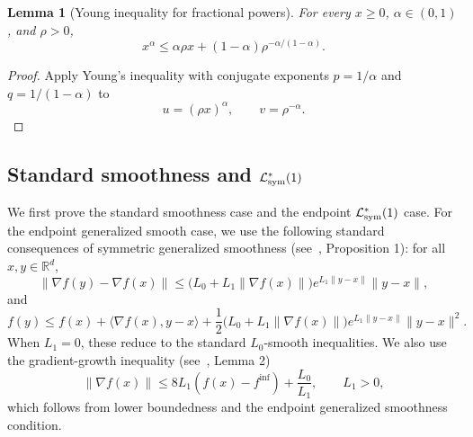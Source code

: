 \documentclass[letter,11pt]{article}
\newtheorem{lemma}[]{Lemma}
\newcommand{\R}{\mathbb{R}}
\newcommand{\Lcal}{\mathcal{L}}
\begin{document}
\begin{lemma}[Young inequality for fractional powers]
\label{lem:app_young_alpha}
For every \(x\ge0\), \(\alpha\in(0,1)\), and \(\rho>0\),
\begin{equation}
\label{eq:app_young_alpha}
    x^\alpha
    \le
    \alpha\rho x+(1-\alpha)\rho^{-\alpha/(1-\alpha)}.
\end{equation}
\end{lemma}

\begin{proof}
Apply Young's inequality with conjugate exponents
\(p=1/\alpha\) and \(q=1/(1-\alpha)\) to
\[
    u=(\rho x)^\alpha,
    \qquad
    v=\rho^{-\alpha}.
\]
\end{proof}

\subsection{Standard smoothness and \texorpdfstring{$\Lcal^*_{\rm sym}(1)$}{lsym1}}
\label{app:nsgdm_l1_case}

We first prove the standard smoothness case and the endpoint
\(\mathcal L_{\rm sym}^*(1)\) case. For the endpoint generalized smooth case, we use the following standard consequences of symmetric generalized smoothness (see~\citet{chen2023generalized}, Proposition 1):
for all \(x,y\in\R^d\),
\begin{equation}
\label{eq:app_l1_grad_consequence}
    \|\nabla f(y)-\nabla f(x)\|
    \le
    \bigl(L_0+L_1\|\nabla f(x)\|\bigr)
    e^{L_1\|y-x\|}\|y-x\|,
\end{equation}
and
\begin{equation}
\label{eq:app_l1_func_consequence}
    f(y)
    \le
    f(x)+\langle\nabla f(x),y-x\rangle
    +\frac12
    \bigl(L_0+L_1\|\nabla f(x)\|\bigr)
    e^{L_1\|y-x\|}
    \|y-x\|^2.
\end{equation}
When \(L_1=0\), these reduce to the standard \(L_0\)-smooth inequalities.
We also use the gradient-growth inequality (see~\citet{khirirat2026error}, Lemma 2)
\begin{equation}
\label{eq:app_grad_growth_l1}
    \|\nabla f(x)\|
    \le
    8L_1(f(x)-f^{\inf})+\frac{L_0}{L_1},
    \qquad L_1>0,
\end{equation}
which follows from lower boundedness and the endpoint generalized smoothness
condition.
\end{document}
